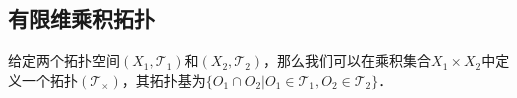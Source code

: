 \subsection{有限维乘积拓扑}

给定两个拓扑空间$(X_1, \mathcal{T}_1)$和$(X_2, \mathcal{T}_2)$，那么我们可以在乘积集合$X_1\times X_2$中定义一个拓扑$(\mathcal{T_\times})$，其拓扑基为$\{O_1\cap O_2|O_1\in\mathcal{T_1}, O_2\in\mathcal{T_2}\}$．
